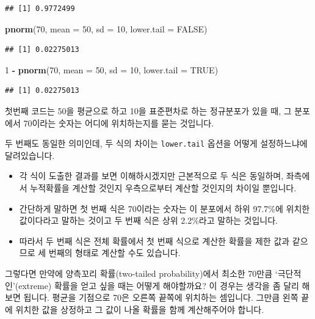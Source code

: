 \documentclass[]{book}
\newenvironment{Shaded}{\begin{snugshade}}{\end{snugshade}}
\newcommand{\DataTypeTok}[1]{\textcolor[rgb]{0.13,0.29,0.53}{#1}}
\newcommand{\DecValTok}[1]{\textcolor[rgb]{0.00,0.00,0.81}{#1}}
\newcommand{\KeywordTok}[1]{\textcolor[rgb]{0.13,0.29,0.53}{\textbf{#1}}}
\newcommand{\NormalTok}[1]{#1}
\newcommand{\OperatorTok}[1]{\textcolor[rgb]{0.81,0.36,0.00}{\textbf{#1}}}
\newcommand{\OtherTok}[1]{\textcolor[rgb]{0.56,0.35,0.01}{#1}}
\newcommand{\StringTok}[1]{\textcolor[rgb]{0.31,0.60,0.02}{#1}}
\providecommand{\tightlist}{%
  \setlength{\itemsep}{0pt}\setlength{\parskip}{0pt}}
\begin{document}
\begin{verbatim}
## [1] 0.9772499
\end{verbatim}

\begin{Shaded}
\begin{Highlighting}[]
\KeywordTok{pnorm}\NormalTok{(}\DecValTok{70}\NormalTok{, }\DataTypeTok{mean =} \DecValTok{50}\NormalTok{, }\DataTypeTok{sd =} \DecValTok{10}\NormalTok{, }\DataTypeTok{lower.tail =} \OtherTok{FALSE}\NormalTok{)}
\end{Highlighting}
\end{Shaded}

\begin{verbatim}
## [1] 0.02275013
\end{verbatim}

\begin{Shaded}
\begin{Highlighting}[]
\DecValTok{1} \OperatorTok{-}\StringTok{ }\KeywordTok{pnorm}\NormalTok{(}\DecValTok{70}\NormalTok{, }\DataTypeTok{mean =} \DecValTok{50}\NormalTok{, }\DataTypeTok{sd =} \DecValTok{10}\NormalTok{, }\DataTypeTok{lower.tail =} \OtherTok{TRUE}\NormalTok{)}
\end{Highlighting}
\end{Shaded}

\begin{verbatim}
## [1] 0.02275013
\end{verbatim}

첫번째 코드는 50을 평균으로 하고 10을 표준편차로 하는 정규분포가 있을 때, 그 분포에서 70이라는 숫자는 어디에 위치하는지를 묻는 것입니다.

두 번째도 동일한 의미인데, 두 식의 차이는 \texttt{lower.tail} 옵션을 어떻게 설정하느냐에 달려있습니다.

\begin{itemize}
\tightlist
\item
  각 식이 도출한 결과를 보면 이해하시겠지만 근본적으로 두 식은 동일하며, 좌측에서 누적확률을 계산할 것인지 우측으로부터 계산할 것인지의 차이일 뿐입니다.
\item
  간단하게 말하면 첫 번째 식은 70이라는 숫자는 이 분포에서 하위 97.7\%에 위치한 값이다라고 말하는 것이고 두 번째 식은 상위 2.2\%라고 말하는 것입니다.
\item
  따라서 두 번째 식은 전체 확률에서 첫 번째 식으로 계산한 확률을 제한 값과 같으므로 세 번째의 형태로 계산할 수도 있습니다.
\end{itemize}

그렇다면 만약에 양측꼬리 확률(two-tailed probability)에서 최소한 70만큼 `극단적인'(extreme) 확률을 얻고 싶을 때는 어떻게 해야할까요? 이 경우는 생각을 좀 달리 해보면 됩니다. 평균을 기점으로 70은 오른쪽 끝쪽에 위치하는 셈입니다. 그만큼 왼쪽 끝에 위치한 값을 상정하고 그 값이 나올 확률을 함께 계산해주어야 합니다.
\end{document}
